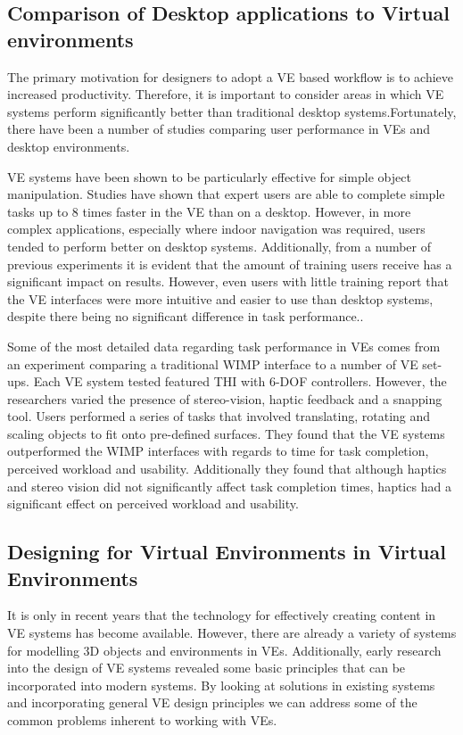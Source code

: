 \documentclass{sig-alternate-05-2015}
\begin{document}
\subsection{Comparison of Desktop applications to Virtual environments}
The primary motivation for designers to adopt a VE based workflow is to achieve increased productivity. Therefore, it is important to consider areas in which VE systems perform significantly better than traditional desktop systems.Fortunately, there have been a number of studies comparing user performance in VEs and desktop environments.

VE systems have been shown to be particularly effective for simple object manipulation. Studies have shown that expert users are able to complete simple tasks up to 8 times faster in the VE than on a desktop\cite{Schultheis2012}. However, in more complex applications, especially where indoor navigation was required, users tended to perform better on desktop systems\cite{SousaSantos2009}. Additionally, from a number of previous experiments it is evident that the amount of training users receive has a significant impact on results. However, even users with little training report that the VE interfaces were more intuitive and easier to use than desktop systems, despite there being no significant difference in task performance.\cite{Toma2012}.

Some of the most detailed data regarding task performance in VEs comes from an experiment comparing a traditional WIMP interface to a number of VE set-ups. Each VE system tested featured THI with 6-DOF controllers. However, the researchers varied the presence of stereo-vision, haptic feedback and a snapping tool\cite{Scali2003}. Users performed a series of tasks that involved translating, rotating and scaling objects to fit onto pre-defined surfaces. They found that the VE systems outperformed the WIMP interfaces with regards to time for task completion, perceived workload and usability. Additionally they found that although haptics and stereo vision did not significantly affect task completion times, haptics had a significant effect on perceived workload and usability.


\subsection{Designing for Virtual Environments in Virtual Environments}
It is only in recent years that the technology for effectively creating content in VE systems has become available. However, there are already a variety of systems for modelling 3D objects and environments in VEs. Additionally, early research into the design of VE systems revealed some basic principles that can be incorporated into modern systems. By looking at solutions in existing systems and incorporating general VE design principles we can address some of the common problems inherent to working with VEs.
\end{document}
